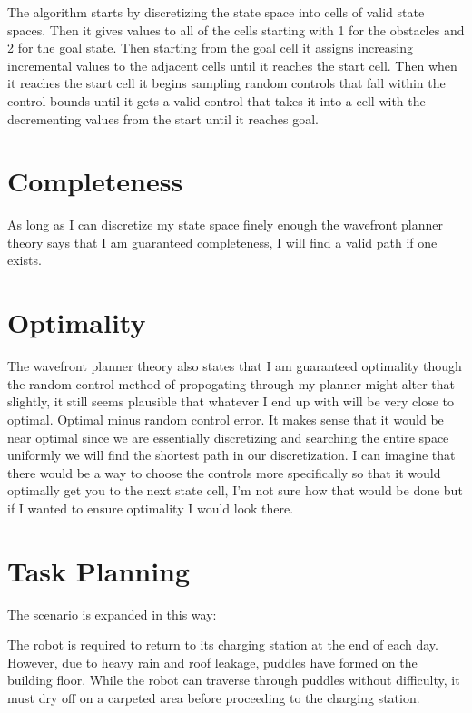 \documentclass{article}
\begin{document}
The algorithm starts by discretizing the state space into cells of valid state spaces. Then it gives values to all of the cells starting with 1 for the obstacles and 2 for the goal state.
Then starting from the goal cell it assigns increasing incremental values to the adjacent cells until it reaches the start cell.
Then when it reaches the start cell it begins sampling random controls that fall within the control bounds until it gets a valid control that takes it into a cell with the decrementing values from the start until it reaches goal.

\section{Completeness}

As long as I can discretize my state space finely enough the wavefront planner theory says that I am guaranteed completeness, I will find a valid path if one exists.

\section{Optimality}

The wavefront planner theory also states that I am guaranteed optimality though the random control method of propogating through my planner might alter that slightly, it still seems plausible that whatever I end up with will be very close to optimal.
Optimal minus random control error. It makes sense that it would be near optimal since we are essentially discretizing and searching the entire space uniformly we will find the shortest path in our discretization.
I can imagine that there would be a way to choose the controls more specifically so that it would optimally get you to the next state cell, I'm not sure how that would be done but if I wanted to ensure optimality I would look there.

\section{Task Planning}

The scenario is expanded in this way:

The robot is required to return to its charging station at the end of each day. However, due to
heavy rain and roof leakage, puddles have formed on the building floor. While the robot can
traverse through puddles without difficulty, it must dry off on a carpeted area before proceeding
to the charging station. 
\end{document}
